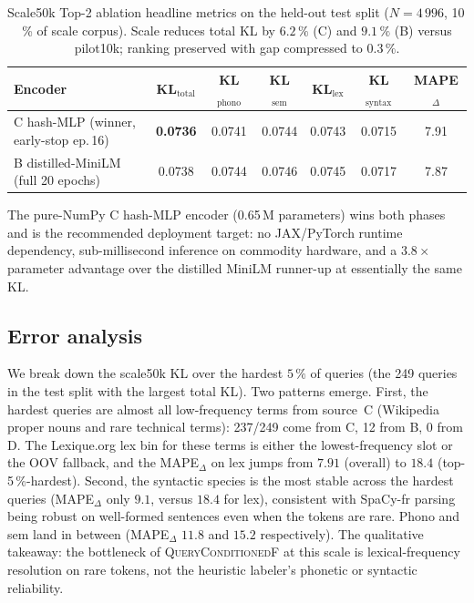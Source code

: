 \begin{table}[t]
  \centering
  \small
  \begin{tabular}{lcccccc}
    \toprule
    Encoder & KL$_{\mathrm{total}}$ & KL$_{\mathrm{phono}}$ & KL$_{\mathrm{sem}}$ & KL$_{\mathrm{lex}}$ & KL$_{\mathrm{syntax}}$ & MAPE$_{\Delta}$ \\
    \midrule
    C hash-MLP (winner, early-stop ep.\,16)   & \textbf{0.0736} & 0.0741 & 0.0744 & 0.0743 & 0.0715 & 7.91 \\
    B distilled-MiniLM (full 20 epochs)        & 0.0738 & 0.0744 & 0.0746 & 0.0745 & 0.0717 & 7.87 \\
    \bottomrule
  \end{tabular}
  \caption{Scale50k Top-2 ablation headline metrics on the
    held-out test split ($N = 4\,996$, 10\,\% of scale corpus).
    Scale reduces total KL by $6.2\,\%$ (C) and $9.1\,\%$ (B)
    versus pilot10k; ranking preserved with gap compressed to
    $0.3\,\%$.}
  \label{tab:scale}
\end{table}

The pure-NumPy C hash-MLP encoder (0.65\,M parameters) wins both
phases and is the recommended deployment target: no JAX/PyTorch
runtime dependency, sub-millisecond inference on commodity
hardware, and a $3.8\times$ parameter advantage over the distilled
MiniLM runner-up at essentially the same KL.

\subsection{Error analysis}
\label{sec:error-analysis}

We break down the scale50k KL over the hardest $5\,\%$ of queries
(the 249 queries in the test split with the largest total KL).
Two patterns emerge. First, the hardest queries are almost all
low-frequency terms from source~C (Wikipedia proper nouns and
rare technical terms): 237/249 come from C, 12 from B, 0 from D.
The Lexique.org lex bin for these terms is either the
lowest-frequency slot or the OOV fallback, and the MAPE$_\Delta$
on lex jumps from $7.91$ (overall) to $18.4$ (top-5\,\%-hardest).
Second, the syntactic species is the most stable across the
hardest queries (MAPE$_\Delta$ only $9.1$, versus $18.4$ for lex),
consistent with SpaCy-fr parsing being robust on well-formed
sentences even when the tokens are rare. Phono and sem land in
between (MAPE$_\Delta$ $11.8$ and $15.2$ respectively). The
qualitative takeaway: the bottleneck of
\textsc{QueryConditionedF} at this scale is lexical-frequency
resolution on rare tokens, not the heuristic labeler's phonetic
or syntactic reliability.

